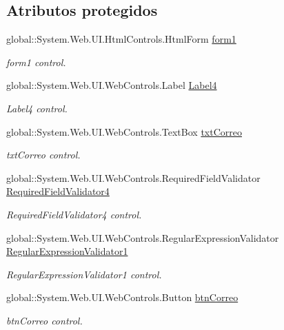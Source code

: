 \subsection*{Atributos protegidos}
\begin{DoxyCompactItemize}
\item 
global\+::\+System.\+Web.\+U\+I.\+Html\+Controls.\+Html\+Form \mbox{\hyperlink{classwebprueba_1_1_cambiar_password_aebe6cc7efa0dd3740d4071ba426d936b}{form1}}
\begin{DoxyCompactList}\small\item\em form1 control. \end{DoxyCompactList}\item 
global\+::\+System.\+Web.\+U\+I.\+Web\+Controls.\+Label \mbox{\hyperlink{classwebprueba_1_1_cambiar_password_aab5db88116d7c2167c3d83083917cf65}{Label4}}
\begin{DoxyCompactList}\small\item\em Label4 control. \end{DoxyCompactList}\item 
global\+::\+System.\+Web.\+U\+I.\+Web\+Controls.\+Text\+Box \mbox{\hyperlink{classwebprueba_1_1_cambiar_password_a1c9b7aa721934e24d4db613ee9e24690}{txt\+Correo}}
\begin{DoxyCompactList}\small\item\em txt\+Correo control. \end{DoxyCompactList}\item 
global\+::\+System.\+Web.\+U\+I.\+Web\+Controls.\+Required\+Field\+Validator \mbox{\hyperlink{classwebprueba_1_1_cambiar_password_ab1cb1ac57b69ed314bf45093d123a50a}{Required\+Field\+Validator4}}
\begin{DoxyCompactList}\small\item\em Required\+Field\+Validator4 control. \end{DoxyCompactList}\item 
global\+::\+System.\+Web.\+U\+I.\+Web\+Controls.\+Regular\+Expression\+Validator \mbox{\hyperlink{classwebprueba_1_1_cambiar_password_a5abb9a75014840a69a4233e6a75569b2}{Regular\+Expression\+Validator1}}
\begin{DoxyCompactList}\small\item\em Regular\+Expression\+Validator1 control. \end{DoxyCompactList}\item 
global\+::\+System.\+Web.\+U\+I.\+Web\+Controls.\+Button \mbox{\hyperlink{classwebprueba_1_1_cambiar_password_ad380120feab352ba019127db43acd6bf}{btn\+Correo}}
\begin{DoxyCompactList}\small\item\em btn\+Correo control. \end{DoxyCompactList}\item 

\end{DoxyCompactItemize}
